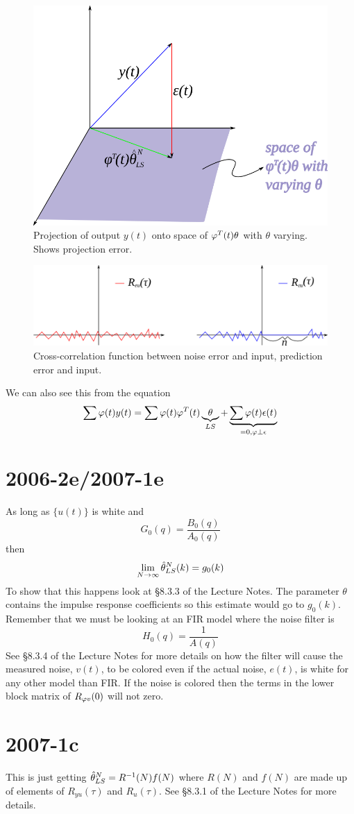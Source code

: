 \documentclass[lecture,12pt,]{pcms-l}
\begin{document}
\begin{figure}[ht!]
  \centering
  \includegraphics[width=.5\textwidth]{images/mt062d2}
  \caption{Projection of output $y(t)$ onto space of $\varphi^T(t)\theta$ with $\theta$ varying. Shows projection error.}
  \label{fig:mt062d2}
\end{figure}

\begin{figure}[ht!]
  \centering
  \includegraphics[width=.5\textwidth]{images/mt062d1}
  \caption{Cross-correlation function between noise error and input, prediction error and input.}
  \label{fig:mt062d1}
\end{figure}

We can also see this from the equation
$$\sum\varphi(t)y(t) = \sum\varphi(t)\varphi^T(t)\underbrace{\theta}_{LS} + \underbrace{\sum\varphi(t)\epsilon(t)}_{=0, \varphi\perp\epsilon}$$

\section{2006-2e/2007-1e}
As long as $\{u(t)\}$ is white and
$$G_0(q)=\frac{B_0(q)}{A_0(q)}$$
then
$$\lim_{N\to\infty}\hat{\theta}_{LS}^N(k)=g_0(k)$$
To show that this happens look at \S8.3.3 of the Lecture Notes. The parameter $\theta$ contains the impulse response coefficients so this estimate would go to $g_0(k)$. Remember that we must be looking at an FIR model where the noise filter is
$$H_0(q)=\frac{1}{A(q)}$$
See \S8.3.4 of the Lecture Notes for more details on how the filter will cause the measured noise, $v(t)$, to be colored even if the actual noise, $e(t)$, is white for any other model than FIR. If the noise is colored then the terms in the lower block matrix of $R_{\varphi v}(0)$ will not zero.

\section{2007-1c}
This is just getting $\hat{\theta}_{LS}^N=R^{-1}(N)f(N)$ where $R(N)$ and $f(N)$ are made up of elements of $R_{yu}(\tau)$ and $R_u(\tau)$. See \S8.3.1 of the Lecture Notes for more details.
\end{document}
